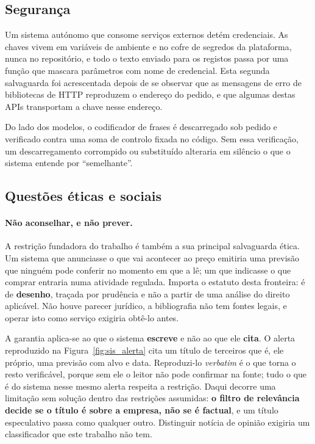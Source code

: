 \subsection{Segurança}
\label{sec:met_seguranca}

Um sistema autónomo que consome serviços externos detém credenciais. As chaves vivem em variáveis
de ambiente e no cofre de segredos da plataforma, nunca no repositório, e todo o texto enviado para
os registos passa por uma função que mascara parâmetros com nome de credencial. Esta segunda
salvaguarda foi acrescentada depois de se observar que as mensagens de erro de bibliotecas de HTTP
reproduzem o endereço do pedido, e que algumas destas \glspl{API} transportam a chave nesse
endereço.

Do lado dos modelos, o codificador de frases é descarregado sob pedido e verificado contra uma soma
de controlo fixada no código. Sem essa verificação, um descarregamento corrompido ou substituído
alteraria em silêncio o que o sistema entende por ``semelhante''.

\subsection{Questões éticas e sociais}
\label{sec:met_etica}

\paragraph{Não aconselhar, e não prever.} A restrição fundadora do trabalho é também a sua
principal salvaguarda ética. Um sistema que anunciasse o que vai acontecer ao preço emitiria uma
previsão que ninguém pode conferir no momento em que a lê; um que indicasse o que comprar entraria
numa atividade regulada. Importa o estatuto desta fronteira: é de \textbf{desenho}, traçada por
prudência e não a partir de uma análise do direito aplicável. Não houve parecer jurídico, a
bibliografia não tem fontes legais, e operar isto como serviço exigiria obtê-lo antes.

A garantia aplica-se ao que o sistema \textbf{escreve} e não ao que ele \textbf{cita}. O alerta
reproduzido na Figura~\ref{fig:sis_alerta} cita um título de terceiros que é, ele próprio, uma
previsão com alvo e data. Reproduzi-lo \emph{verbatim} é o que torna o resto verificável, porque
sem ele o leitor não pode confirmar na fonte; tudo o que é do sistema nesse mesmo alerta respeita a
restrição. Daqui decorre uma limitação sem solução dentro das restrições assumidas: \textbf{o filtro
de relevância decide se o título é sobre a empresa, não se é factual}, e um título especulativo
passa como qualquer outro. Distinguir notícia de opinião exigiria um classificador que este
trabalho não tem.

